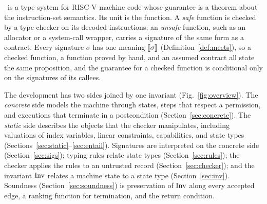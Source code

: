\sys\ is a type system for RISC-V machine code whose guarantee is a theorem about the instruction-set semantics. Its unit is the function. A \emph{safe} function is checked by a type checker on its decoded instructions; an \emph{unsafe} function, such as an allocator or a system-call wrapper, carries a signature of the same form as a contract. Every signature $\sigma$ has one meaning $[\![\sigma]\!]$ (Definition~\ref{def:meets}), so a checked function, a function proved by hand, and an assumed contract all state the same proposition, and the guarantee for a checked function is conditional only on the signatures of its callees.

The development has two sides joined by one invariant (Fig.~\ref{fig:overview}). The \emph{concrete} side models the machine through states, steps that respect a permission, and executions that terminate in a postcondition (Section~\ref{sec:concrete}). The \emph{static} side describes the objects that the checker manipulates, including valuations of index variables, linear constraints, capabilities, and state types (Sections~\ref{sec:static}--\ref{sec:entail}). Signatures are interpreted on the concrete side (Section~\ref{sec:sigs}); typing rules relate state types (Section~\ref{sec:rules}); the checker applies the rules to an untrusted record (Section~\ref{sec:checker}); and the invariant $\mathrm{Inv}$ relates a machine state to a state type (Section~\ref{sec:inv}). Soundness (Section~\ref{sec:soundness}) is preservation of $\mathrm{Inv}$ along every accepted edge, a ranking function for termination, and the return condition.

